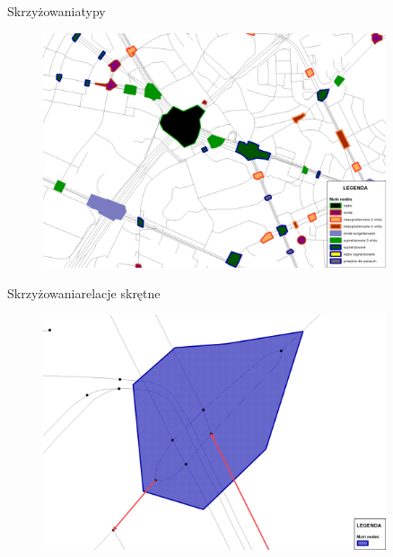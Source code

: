 \documentclass[8pt]{beamer}
\begin{document}
\begin{frame}{Skrzyżowania}{typy}
\begin{figure}\begin{center}
\includegraphics[width=0.9\textwidth]{main_nodes}
 \end{center}  \end{figure} 
\end{frame}

\begin{frame}{Skrzyżowania}{relacje skrętne}
\begin{figure}\begin{center}
\includegraphics[width=0.9\textwidth]{main_turn}
 \end{center}  \end{figure} 
\end{frame}
\end{document}

